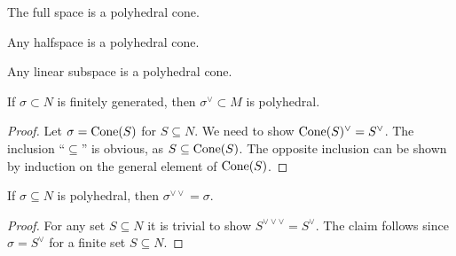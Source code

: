 \begin{proposition}
  \label{all-polyhedral-cone}
  The full space is a polyhedral cone.
\end{proposition}

\begin{proposition}
  \label{halfspace-polyhedral-cone}
  Any halfspace is a polyhedral cone.
\end{proposition}

\begin{proposition}
  \label{linear-subspace-polyhedral-cone}
  Any linear subspace is a polyhedral cone.
\end{proposition}


\begin{proposition}
  \label{dual-polyhedral}
  If \( \sigma \subset N \) is finitely generated, then \( \sigma^\vee
  \subset M \) is polyhedral.
\end{proposition}
\begin{proof}
  \uses{}
  Let \( \sigma = \operatorname{Cone}(S) \) for \( S \subseteq N \). We need to show
  \( \operatorname{Cone}(S)^\vee = S^\vee \). The inclusion ``\( \subseteq \)'' is
  obvious, as \( S \subseteq \operatorname{Cone}(S) \). The opposite inclusion can
  be shown by induction on the general element of \( \operatorname{Cone}(S) \).
\end{proof}

\begin{proposition}
  \label{double-dual-polyhedral-cone}
  If \( \sigma \subseteq N \) is polyhedral, then \( \sigma^{\vee\vee}
  = \sigma \).
\end{proposition}
\begin{proof}
  \uses{}
  For any set \( S \subseteq N \) it is trivial to show \(
  S^{\vee\vee\vee} = S^{\vee} \). The claim follows since \( \sigma =
  S^{\vee} \) for a finite set \( S \subseteq N \).
\end{proof}


